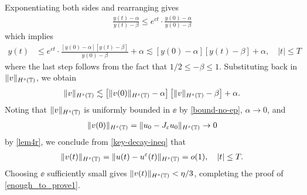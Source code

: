 %
%
Exponentiating both sides and rearranging gives
%
%
\begin{equation*}
	\begin{split}
		\frac{y(t) - \alpha}{y(t) - \beta} \le e^{ct} \cdot
		\frac{y(0) - \alpha}{y(0) - \beta}	
	\end{split}
\end{equation*}
%
%
which implies
%
%
\begin{equation*}
	\begin{split}
		y(t) 
		& \le e^{ct} \cdot \frac{\left [y(0) - \alpha \right ]
		\left [y(t) - \beta \right ]}{y(0) - 
		\beta} + \alpha
		 \lesssim \left [y(0) - \alpha \right ] \left [y(t) - \beta \right ] + \alpha, \quad |t| \le T
	\end{split}
\end{equation*}
%
%
where the last step follows from the fact that $1/2 \le -\beta \le 1$.  Substituting back in $\|v\|_{H^s(\mathbb{T})}$, we obtain
\begin{equation}
	\label{key-decay-ineq}
	\begin{split}
		\|v\|_{H^s(\mathbb{T})}  \lesssim \left [\|v(0)\|_{H^s(\mathbb{T})} - 
		\alpha \right ] \left [\|v\|_{H^s(\mathbb{T})} - \beta \right ] + \alpha.
	\end{split}
\end{equation}
Noting that $\|v\|_{H^s(\mathbb{T})}$ is uniformly bounded in $\ee$ by 
\eqref{bound-no-ep}, $\alpha \to 0$, and
%
%
\begin{equation*}
\label{303''qx}
\begin{split}
\|v(0)\|_{H^s(\mathbb{T})} = \|u_0 - J_\varepsilon u_0 \|_{H^s(\mathbb{T})} \to 0 \end{split}
\end{equation*}
by  \cref{lem4r}, we conclude from \eqref{key-decay-ineq} that
%
%
\begin{equation}
\label{304qx}
\begin{split}
\|v(t)\|_{H^s(\mathbb{T})} = 
\|u(t) - u^\varepsilon(t) \|_{H^s(\mathbb{T})}= o(1), \quad |t| \le T.
\end{split}
\end{equation}
%
%
Choosing $\ee$ sufficiently small gives $\|v(t)\|_{H^s(\mathbb{T})} < \eta/3$, 
completing the proof of \eqref{enough_to_prove1}. \qquad \qedsymbol
%
%
%
%
%

